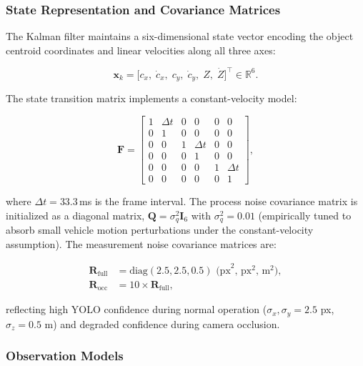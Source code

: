 \documentclass{jstarticle}
\theoremstyle{remark}
\begin{document}
\subsubsection{State Representation and Covariance Matrices}

The Kalman filter maintains a six-dimensional state vector encoding
the object centroid coordinates and linear velocities along all three
axes:

\begin{equation}
\mathbf{x}_k = \bigl[c_x,\; \dot{c}_x,\; c_y,\; \dot{c}_y,\;
               Z,\; \dot{Z}\bigr]^{\top} \in \mathbb{R}^6.
\label{eq:state}
\end{equation}

The state transition matrix implements a constant-velocity model:

\begin{equation}
\mathbf{F} =
\begin{bmatrix}
1 & \Delta t & 0 & 0 & 0 & 0 \\
0 & 1 & 0 & 0 & 0 & 0 \\
0 & 0 & 1 & \Delta t & 0 & 0 \\
0 & 0 & 0 & 1 & 0 & 0 \\
0 & 0 & 0 & 0 & 1 & \Delta t \\
0 & 0 & 0 & 0 & 0 & 1
\end{bmatrix},
\label{eq:F_matrix}
\end{equation}

\noindent where $\Delta t = 33.3$\,ms is the frame interval. The process noise covariance matrix is initialized as a diagonal matrix, $\mathbf{Q} = \sigma_q^2 \mathbf{I}_6$ with $\sigma_q^2 = 0.01$ (empirically tuned to absorb small vehicle motion perturbations under the constant-velocity assumption). The measurement noise covariance matrices are:

\begin{align}
\mathbf{R}_{\mathrm{full}} &= \text{diag}(2.5, 2.5, 0.5) \text{ (px}^2\text{, px}^2\text{, m}^2\text{)}, \label{eq:R_full} \\
\mathbf{R}_{\mathrm{occ}} &= 10 \times \mathbf{R}_{\mathrm{full}},
\label{eq:R_occ}
\end{align}

\noindent reflecting high YOLO confidence during normal operation ($\sigma_x, \sigma_y = 2.5$ px, $\sigma_z = 0.5$ m) and degraded confidence during camera occlusion.

\subsubsection{Observation Models}
\end{document}
